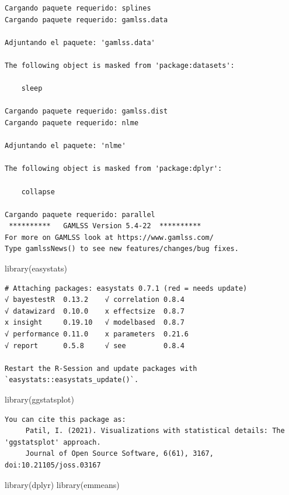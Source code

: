 \documentclass[
  letterpaper,
  DIV=11,
  numbers=noendperiod]{scrartcl}
\newenvironment{Shaded}{\begin{snugshade}}{\end{snugshade}}
\newcommand{\FunctionTok}[1]{\textcolor[rgb]{0.28,0.35,0.67}{#1}}
\newcommand{\NormalTok}[1]{\textcolor[rgb]{0.00,0.23,0.31}{#1}}
\begin{document}
\begin{verbatim}
Cargando paquete requerido: splines
Cargando paquete requerido: gamlss.data

Adjuntando el paquete: 'gamlss.data'

The following object is masked from 'package:datasets':

    sleep

Cargando paquete requerido: gamlss.dist
Cargando paquete requerido: nlme

Adjuntando el paquete: 'nlme'

The following object is masked from 'package:dplyr':

    collapse

Cargando paquete requerido: parallel
 **********   GAMLSS Version 5.4-22  ********** 
For more on GAMLSS look at https://www.gamlss.com/
Type gamlssNews() to see new features/changes/bug fixes.
\end{verbatim}

\begin{Shaded}
\begin{Highlighting}[]
\FunctionTok{library}\NormalTok{(easystats)}
\end{Highlighting}
\end{Shaded}

\begin{verbatim}
# Attaching packages: easystats 0.7.1 (red = needs update)
√ bayestestR  0.13.2    √ correlation 0.8.4  
√ datawizard  0.10.0    x effectsize  0.8.7  
x insight     0.19.10   √ modelbased  0.8.7  
√ performance 0.11.0    x parameters  0.21.6 
√ report      0.5.8     √ see         0.8.4  

Restart the R-Session and update packages with `easystats::easystats_update()`.
\end{verbatim}

\begin{Shaded}
\begin{Highlighting}[]
\FunctionTok{library}\NormalTok{(ggstatsplot)}
\end{Highlighting}
\end{Shaded}

\begin{verbatim}
You can cite this package as:
     Patil, I. (2021). Visualizations with statistical details: The 'ggstatsplot' approach.
     Journal of Open Source Software, 6(61), 3167, doi:10.21105/joss.03167
\end{verbatim}

\begin{Shaded}
\begin{Highlighting}[]
\FunctionTok{library}\NormalTok{(dplyr)}
\FunctionTok{library}\NormalTok{(emmeans)}
\end{Highlighting}
\end{Shaded}
\end{document}
